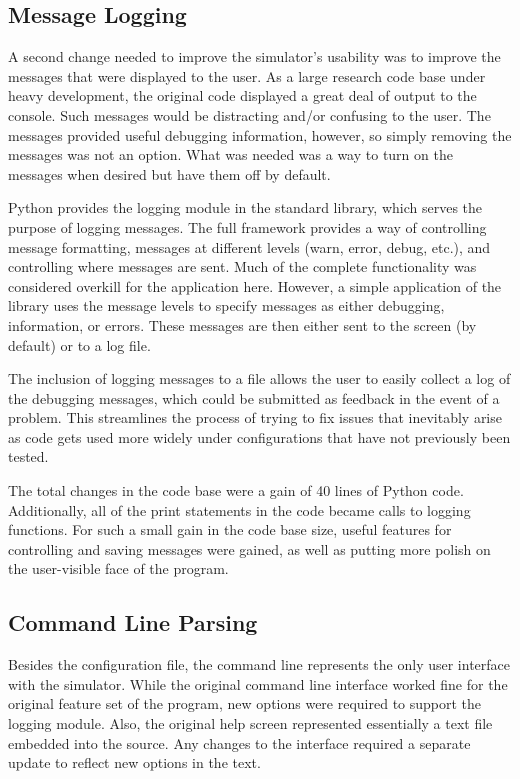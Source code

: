 \documentclass[twocolumn]{article}
\begin{document}
\subsection{Message Logging}
A second change needed to improve the simulator's usability was to improve the
messages that were displayed to the user.  As a large research code base under heavy
development, the original code displayed a great deal of output to the console.
Such messages would be distracting and/or confusing to the user. The messages
provided useful debugging information, however, so simply removing the messages
was not an option. What was needed was a way to turn on the messages when desired
but have them off by default.

Python provides the logging module in the standard library, which serves the
purpose of logging messages. The full framework provides a way of controlling
message formatting, messages at different levels (warn, error, debug, etc.), and
controlling where messages are sent. Much of the complete functionality was
considered overkill for the application here. However, a simple application of
the library uses the message levels to specify messages as either
debugging, information, or errors. These messages are then either sent to the
screen (by default) or to a log file.

The inclusion of logging messages to a file allows the user to easily collect
a log of the debugging messages, which could be submitted as feedback in the
event of a problem. This streamlines the process of trying to fix issues that
inevitably arise as code gets used more widely under configurations that have
not previously been tested.

The total changes in the code base were a gain of 40 lines of Python code.
Additionally, all of the print statements in the code became
calls to logging functions. For such a small gain in the code base size, useful
features for controlling and saving messages were gained, as well as putting
more polish on the user-visible face of the program.

\subsection{Command Line Parsing}
Besides the configuration file, the command line represents the only user
interface with the simulator. While the original command line interface
worked fine for the original feature set of the program, new options
were required to support the logging module.  Also, the original help screen
represented essentially a text file embedded into the source. Any changes to
the interface required a separate update to reflect new options in the text.
\end{document}
